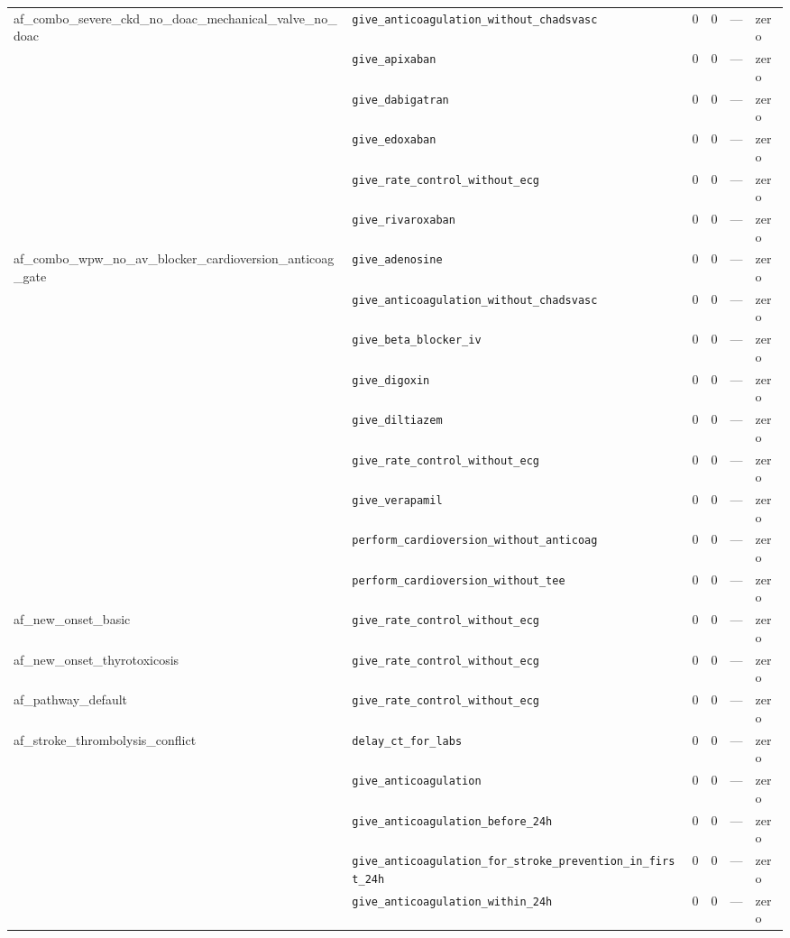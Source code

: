 \begin{table}[ht]
\begin{tabular}{llrrrl}
af\_combo\_severe\_ckd\_no\_doac\_mechanical\_valve\_no\_doac & \texttt{give\_anticoagulation\_without\_chadsvasc} & 0 & 0 & — & zero \\
 & \texttt{give\_apixaban} & 0 & 0 & — & zero \\
 & \texttt{give\_dabigatran} & 0 & 0 & — & zero \\
 & \texttt{give\_edoxaban} & 0 & 0 & — & zero \\
 & \texttt{give\_rate\_control\_without\_ecg} & 0 & 0 & — & zero \\
 & \texttt{give\_rivaroxaban} & 0 & 0 & — & zero \\
\midrule
af\_combo\_wpw\_no\_av\_blocker\_cardioversion\_anticoag\_gate & \texttt{give\_adenosine} & 0 & 0 & — & zero \\
 & \texttt{give\_anticoagulation\_without\_chadsvasc} & 0 & 0 & — & zero \\
 & \texttt{give\_beta\_blocker\_iv} & 0 & 0 & — & zero \\
 & \texttt{give\_digoxin} & 0 & 0 & — & zero \\
 & \texttt{give\_diltiazem} & 0 & 0 & — & zero \\
 & \texttt{give\_rate\_control\_without\_ecg} & 0 & 0 & — & zero \\
 & \texttt{give\_verapamil} & 0 & 0 & — & zero \\
 & \texttt{perform\_cardioversion\_without\_anticoag} & 0 & 0 & — & zero \\
 & \texttt{perform\_cardioversion\_without\_tee} & 0 & 0 & — & zero \\
\midrule
af\_new\_onset\_basic & \texttt{give\_rate\_control\_without\_ecg} & 0 & 0 & — & zero \\
\midrule
af\_new\_onset\_thyrotoxicosis & \texttt{give\_rate\_control\_without\_ecg} & 0 & 0 & — & zero \\
\midrule
af\_pathway\_default & \texttt{give\_rate\_control\_without\_ecg} & 0 & 0 & — & zero \\
\midrule
af\_stroke\_thrombolysis\_conflict & \texttt{delay\_ct\_for\_labs} & 0 & 0 & — & zero \\
 & \texttt{give\_anticoagulation} & 0 & 0 & — & zero \\
 & \texttt{give\_anticoagulation\_before\_24h} & 0 & 0 & — & zero \\
 & \texttt{give\_anticoagulation\_for\_stroke\_prevention\_in\_first\_24h} & 0 & 0 & — & zero \\
 & \texttt{give\_anticoagulation\_within\_24h} & 0 & 0 & — & zero \\

\end{tabular}
\end{table}
